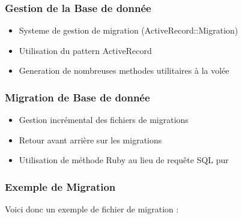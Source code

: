 \documentclass{beamer}
\begin{document}
\begin{frame}
    \frametitle{Gestion de la Base de donnée}
    \begin{itemize}
        \item Systeme de gestion de migration (ActiveRecord::Migration)
        \item Utilisation du pattern ActiveRecord
        \item Generation de nombreuses methodes utilitaires à la volée
    \end{itemize}
\end{frame}

\begin{frame}
    \frametitle{Migration de Base de donnée}
    \begin{itemize}
        \item Gestion incrémental des fichiers de migrations
        \item Retour avant arrière sur les migrations
        \item Utilisation de méthode Ruby au lieu de requête SQL pur
    \end{itemize}
\end{frame}
\begin{frame}
    \frametitle{Exemple de Migration}

    Voici donc un exemple de fichier de migration :


    \begin{center}
        
    \end{center}
\end{frame}
\end{document}
